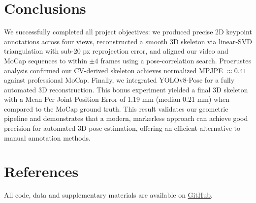 \documentclass[11pt,a4paper]{article}
\begin{document}
\section*{Conclusions}
We successfully completed all project objectives: we produced precise 2D keypoint annotations across four views, reconstructed a smooth 3D skeleton via linear‐SVD triangulation with sub-20 px reprojection error, and aligned our video and MoCap sequences to within \(\pm4\) frames using a pose‐correlation search. Procrustes analysis confirmed our CV-derived skeleton achieves normalized MPJPE \(\approx0.41\) against professional MoCap. Finally, we integrated YOLOv8-Pose for a fully automated 3D reconstruction. This bonus experiment yielded a final 3D skeleton with a Mean Per-Joint Position Error of 1.19 mm (median 0.21 mm) when compared to the MoCap ground truth. This result validates our geometric pipeline and demonstrates that a modern, markerless approach can achieve good precision for automated 3D pose estimation, offering an efficient alternative to manual annotation methods.

\section*{References}
All code, data and supplementary materials are available on
\href{https://github.com/gvazzolerunitn/cv-mocap_8}{GitHub}.
\end{document}
